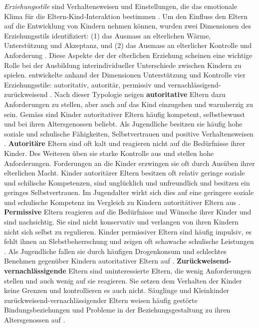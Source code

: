 \textit{Erziehungsstile} sind Verhaltensweisen und Einstellungen, die das emotionale Klima für die Eltern-Kind-Interaktion bestimmen \cite[S.~649]{Siegler2008}. Um den Einfluss den Eltern auf die Entwicklung von Kindern nehmen können, wurden zwei Dimensionen des Erziehungsstils identifiziert: (1) das Ausmass an elterlichen Wärme, Unterstützung und Akzeptanz, und (2) das Ausmass an elterlicher Kontrolle und Anforderung \cite{Maccoby1983}. Diese Aspekte der der elterlichen Erziehung scheinen eine wichtige Rolle bei der Ausbildung interindividueller Unterschiede zwischen Kindern zu spielen.  entwickelte anhand der Dimensionen Unterstützung und Kontrolle vier Erziehungsstile: autoritativ, autoritär, permissiv und vernachlässigend-zurückweisend \cite{Baumrind1991}. Nach dieser Typologie neigen \textbf{autoritative} Eltern dazu Anforderungen zu stellen, aber auch auf das Kind einzugehen und warmherzig zu sein. Gemäss  sind Kinder autoritativer Eltern häufig kompetent, selbstbewusst und bei ihren Altersgenossen beliebt. Als Jugendliche besitzen sie häufig hohe soziale und schulische Fähigkeiten, Selbstvertrauen und positive Verhaltensweisen \cite{Lamborn1991}. \textbf{Autoritäre} Eltern sind oft kalt und reagieren nicht auf die Bedürfnisse ihrer Kinder. Des Weiteren üben sie starke Kontrolle aus und stellen hohe Anforderungen. Forderungen an die Kinder erzwingen sie oft durch Ausüben ihrer elterlichen Macht. Kinder autoritärer Eltern besitzen oft relativ geringe soziale und schilische Kompetenzen, sind unglücklich und unfreundlich und besitzen ein geringes Selbstvertrauen. Im Jugendalter wirkt sich dies auf eine geringere soziale und schulische Kompetenz im Vergleich zu Kindern autoritätiver Eltern aus \cite{Baumrind1991, Lamborn1991}.  \textbf{Permissive} Eltern reagieren auf die Bedürfnisse und Wünsche ihrer Kinder und sind nachsichtig. Sie sind nicht konservativ und verlangen von ihren Kindern nicht sich selbst zu regulieren. Kinder permissiver Eltern sind häufig impulsiv, es fehlt ihnen an Slebstbeherrschung und zeigen oft schawache schulische Leistungen \cite{Baumrind1991}. Als Jugendliche fallen sie durch häufigen Drogenkonsum und schlechtes Benehmen gegenüber Kindern autoritativer Eltern auf \cite{Lamborn1991}. \textbf{Zurückweisend-vernachlässigende} Eltern sind uninteressierte Eltern, die wenig Anforderungen stellen und auch wenig auf sie reagieren. Sie setzen dem Verhalten der Kinder keine Grenzen und kontrollieren es auch nicht. Säuglinge und Kleinkinder zurückweisend-vernachlässigender Eltern weisen häufig gestörte Bindungsbeziehungen und Probleme in der Beziehungsgestaltung zu ihren Altersgenossen auf \cite{Parke1998}.


